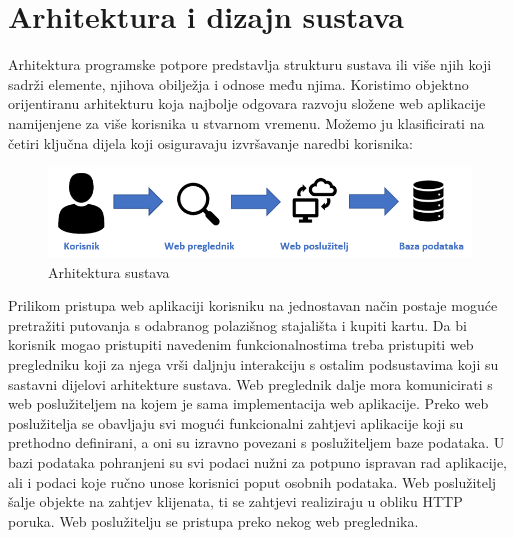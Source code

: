 \chapter{Arhitektura i dizajn sustava}

{Arhitektura programske potpore predstavlja strukturu sustava ili više njih koji sadrži elemente, njihova obilježja i odnose među njima. Koristimo objektno orijentiranu arhitekturu koja najbolje odgovara razvoju složene web aplikacije namijenjene za više korisnika u stvarnom vremenu. Možemo ju klasificirati na četiri ključna dijela koji osiguravaju izvršavanje naredbi korisnika:

\begin{packed_item}
				\item {}
				\item {}
				\item {}
				\item {}
			\end{packed_item}

				\begin{figure}[H]
					\centering
					\includegraphics[width=1\linewidth]{"slike/arhitekturaApp.png"}
					\caption{Arhitektura sustava}
					\label{fig:arhitektura-sustava}
				\end{figure}

Prilikom pristupa web aplikaciji korisniku na jednostavan način postaje moguće pretražiti putovanja s odabranog polazišnog stajališta i kupiti kartu. Da bi korisnik mogao pristupiti navedenim funkcionalnostima treba pristupiti web pregledniku koji za njega vrši daljnju interakciju s ostalim podsustavima koji su sastavni dijelovi arhitekture sustava. Web preglednik dalje mora komunicirati s web poslužiteljem na kojem je sama implementacija web aplikacije. Preko web poslužitelja se obavljaju svi mogući funkcionalni zahtjevi aplikacije koji su prethodno definirani, a oni su izravno povezani s poslužiteljem baze podataka. U bazi podataka pohranjeni su svi podaci nužni za potpuno ispravan rad aplikacije, ali i podaci koje ručno unose korisnici poput osobnih podataka. Web poslužitelj šalje objekte na zahtjev klijenata, ti se zahtjevi realiziraju u obliku HTTP poruka. Web poslužitelju se pristupa preko nekog web preglednika.

}
